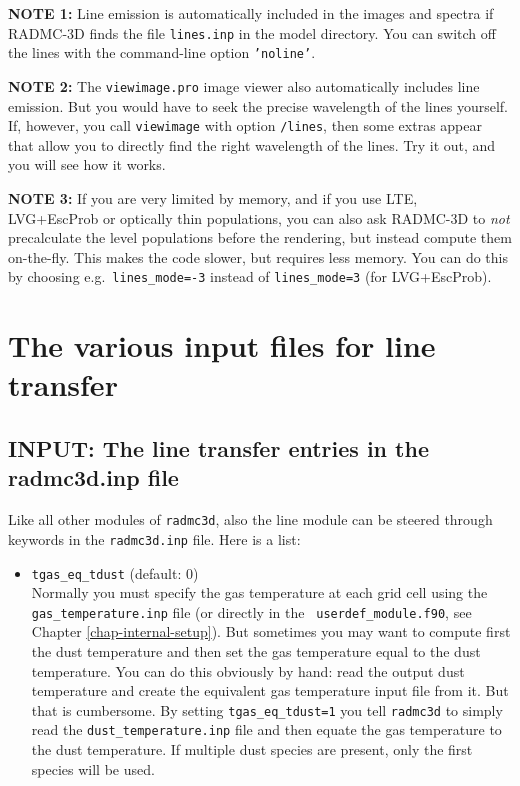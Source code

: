 \documentclass{report}
\begin{document}
{\bf NOTE 1:} Line emission is automatically included in the images and
spectra if RADMC-3D finds the file {\small\tt lines.inp} in the model
directory. You can switch off the lines with the command-line option
{\small\tt 'noline'}. 

{\bf NOTE 2:} The {\small\tt viewimage.pro} image viewer also automatically
includes line emission. But you would have to seek the precise wavelength of
the lines yourself. If, however, you call {\small\tt viewimage} with option
{\small\tt /lines}, then some extras appear that allow you to directly
find the right wavelength of the lines. Try it out, and you will see how
it works.

{\bf NOTE 3:} If you are very limited by memory, and if you use LTE,
LVG+EscProb or optically thin populations, you can also ask RADMC-3D to {\em
  not} precalculate the level populations before the rendering, but instead
compute them on-the-fly. This makes the code slower, but requires less
memory.  You can do this by choosing e.g.\ {\small\tt lines\_mode=-3}
instead of {\small\tt lines\_mode=3} (for LVG+EscProb).

\section{The various input files for line transfer}
\subsection{INPUT: The line transfer entries in the radmc3d.inp file}
\label{sec-line-radmc-inp}
%
Like all other modules of {\small\tt radmc3d}, also the line module
can be steered through keywords in the {\small\tt radmc3d.inp} file.
Here is a list:
\begin{itemize}
\item {\small\tt tgas\_eq\_tdust} (default: 0)\\
  Normally you must specify the gas temperature at each grid cell using the
  {\small\tt gas\_temperature.inp} file (or directly in the {\small\tt
    userdef\_module.f90}, see Chapter \ref{chap-internal-setup}). But
  sometimes you may want to compute first the dust temperature and then set
  the gas temperature equal to the dust temperature. You can do this
  obviously by hand: read the output dust temperature and create the
  equivalent gas temperature input file from it. But that is cumbersome.
  By setting {\small\tt tgas\_eq\_tdust=1} you tell {\small\tt radmc3d} to
  simply read the {\small\tt dust\_temperature.inp} file and then equate
  the gas temperature to the dust temperature. If multiple dust species
  are present, only the first species will be used.
\end{itemize}
\end{document}
